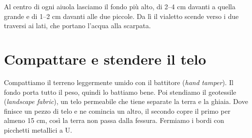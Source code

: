 \documentclass[11pt,a4paper]{article}
\newcommand{\beds}{\foreach \a/\b/\n in {\xA/\xB/1,\xC/\xD/2,\xE/\xF/3}{\draw[mat=mWood] (\a,\Pw) rectangle (\b,\yT);
  \fill[mBed] (\a+.25,\Pw+.25) rectangle (\b-.25,\yT-.25);\node[wlab,font=\footnotesize] at ({(\a+\b)/2},{\Pw+\W/2}) {Aiuola \n};}}
\newcommand{\paths}[1]{\fill[#1] (0,0) rectangle (\xG,\Pw);\foreach \a/\b in {0/\xA,\xB/\xC,\xD/\xE,\xF/\xG}{\fill[#1] (\a,\Pw) rectangle (\b,\yT);}}
\newcommand{\soil}{\fill[mSoil] (0,-3) rectangle (60,-6.5);\node[wlab] at (30,-5) {Terra compattata};}
\newcommand{\cloth}{\draw[mCloth,line width=1.5pt] (0,-3)--(60,-3);}
\begin{document}
Al centro di ogni aiuola lasciamo il fondo più alto, di 2--4 cm davanti a quella grande e di 1--2 cm davanti alle due piccole. Da lì il vialetto scende verso i due traversi ai lati, che portano l'acqua alla scarpata.
\par\nopagebreak
\begin{center}\end{center}

\section{Compattare e stendere il telo}
Compattiamo il terreno leggermente umido con il battitore (\textit{hand tamper}). Il fondo porta tutto il peso, quindi lo battiamo bene. Poi stendiamo il geotessile (\textit{landscape fabric}), un telo permeabile che tiene separate la terra e la ghiaia. Dove finisce un pezzo di telo e ne comincia un altro, il secondo copre il primo per almeno 15 cm, così la terra non passa dalla fessura. Fermiamo i bordi con picchetti metallici a U.
\par\nopagebreak
\begin{center}\end{center}
\end{document}
